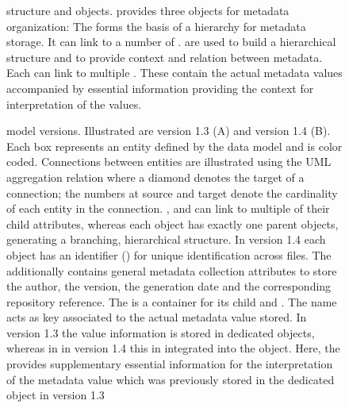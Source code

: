 \begin{figure}
    \centering
    
    \caption[ structure and objects]{ structure and objects.  provides three objects for metadata organization: The   forms the basis of a hierarchy for metadata storage. It can link to a number of  .  are used to build a hierarchical structure and to provide context and relation between metadata. Each  can link to multiple . These contain the actual metadata values accompanied by essential information providing the context for interpretation of the values.}
    \label{fig:intro_odML_structure}
\end{figure}

\begin{figure}
    \centering
    \scalebox{1}{
    }
    \caption[ model versions]{ model versions. Illustrated are  version 1.3 (A) and version 1.4 (B). Each box represents an entity defined by the data model and is color coded. Connections between entities are illustrated using the UML aggregation relation where a diamond denotes the target of a connection; the numbers at source and target denote the cardinality of each entity in the connection. ,  and  can link to multiple of their child attributes, whereas each object has exactly one parent objects, generating a branching, hierarchical structure. In  version 1.4 each object has an identifier () for unique identification across files. The  additionally contains general metadata collection attributes to store the author, the version, the generation date and the corresponding repository reference. The  is a container for its child  and . The  name acts as key associated to the actual metadata value stored. In  version 1.3 the value information is stored in dedicated  objects, whereas in in  version 1.4 this in integrated into the  object. Here, the  provides supplementary essential information for the interpretation of the metadata value which was previously stored in the dedicated  object in  version 1.3}
    \label{fig:intro_odML_model}
\end{figure}

